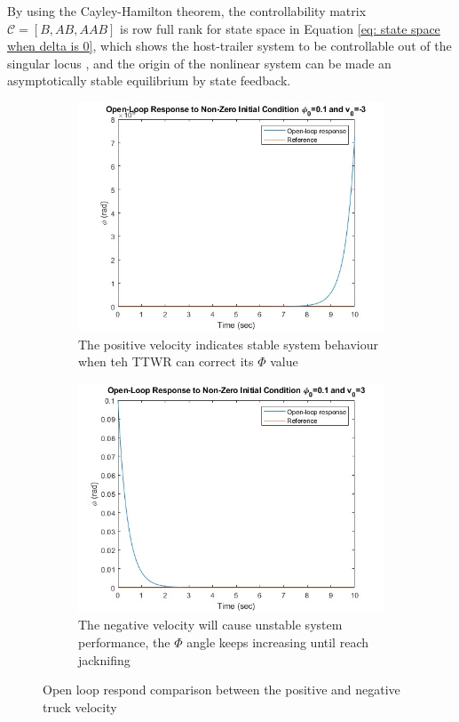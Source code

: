 By using the Cayley-Hamilton theorem, the controllability matrix $\mathcal{C} = [B, AB, AAB]$ is row full rank for state space in Equation \ref{eq: state space when delta is 0}, which shows the host-trailer system to be controllable out of the singular locus \parencite{altafini1999controllability}, and the origin of the nonlinear system can be made an asymptotically stable equilibrium by state feedback.


\begin{figure}
     \centering
     \begin{subfigure}[b]{0.8\textwidth}
         \centering
         \includegraphics[width=0.7\linewidth]{fig/openloop_respond/negative velo openloop response - Copy.jpg}
         \caption{The positive velocity indicates stable system behaviour when teh TTWR can correct its $\Phi$ value}
     \end{subfigure}
     \vfill 
     \begin{subfigure}[b]{0.8\textwidth}
         \centering
         \includegraphics[width=0.7\linewidth]{fig/openloop_respond/positive velo openloop response - Copy.jpg}
         \caption{The negative velocity will cause unstable system performance, the $\Phi$ angle keeps increasing until reach jacknifing}
     \end{subfigure}
    \caption{Open loop respond comparison between the positive and negative truck velocity}
\end{figure}